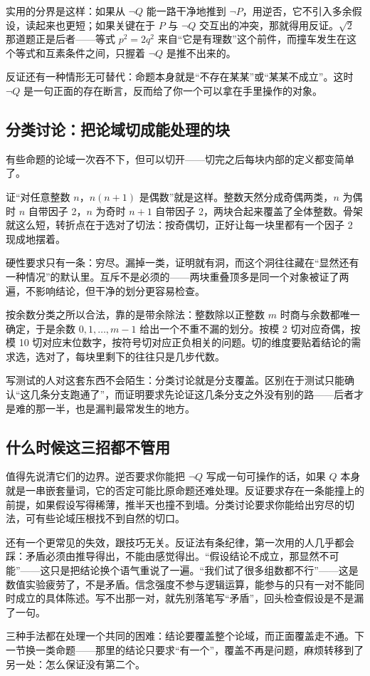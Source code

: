 实用的分界是这样：如果从 \(\neg Q\) 能一路干净地推到 \(\neg P\)，用逆否，它不引入多余假设，读起来也更短；如果关键在于 \(P\) 与 \(\neg Q\) 交互出的冲突，那就得用反证。\(\sqrt2\) 那道题正是后者——等式 \(p^2=2q^2\) 来自``它是有理数''这个前件，而撞车发生在这个等式和互素条件之间，只握着 \(\neg Q\) 是推不出来的。

反证还有一种情形无可替代：命题本身就是``不存在某某''或``某某不成立''。这时 \(\neg Q\) 是一句正面的存在断言，反而给了你一个可以拿在手里操作的对象。

\subsection{分类讨论：把论域切成能处理的块}

有些命题的论域一次吞不下，但可以切开——切完之后每块内部的定义都变简单了。

证``对任意整数 \(n\)，\(n(n+1)\) 是偶数''就是这样。整数天然分成奇偶两类，\(n\) 为偶时 \(n\) 自带因子 2，\(n\) 为奇时 \(n+1\) 自带因子 2，两块合起来覆盖了全体整数。骨架就这么短，转折点在于选对了切法：按奇偶切，正好让每一块里都有一个因子 2 现成地摆着。

硬性要求只有一条：穷尽。漏掉一类，证明就有洞，而这个洞往往藏在``显然还有一种情况''的默认里。互斥不是必须的——两块重叠顶多是同一个对象被证了两遍，不影响结论，但干净的划分更容易检查。

按余数分类之所以合法，靠的是带余除法：整数除以正整数 \(m\) 时商与余数都唯一确定，于是余数 \(0,1,\dots,m-1\) 给出一个不重不漏的划分。按模 2 切对应奇偶，按模 10 切对应末位数字，按符号切对应正负相关的问题。切的维度要贴着结论的需求选，选对了，每块里剩下的往往只是几步代数。

写测试的人对这套东西不会陌生：分类讨论就是分支覆盖。区别在于测试只能确认``这几条分支跑通了''，而证明要求先论证这几条分支之外没有别的路——后者才是难的那一半，也是漏判最常发生的地方。

\subsection{什么时候这三招都不管用}

值得先说清它们的边界。逆否要求你能把 \(\neg Q\) 写成一句可操作的话，如果 \(Q\) 本身就是一串嵌套量词，它的否定可能比原命题还难处理。反证要求存在一条能撞上的前提，如果假设写得稀薄，推半天也撞不到墙。分类讨论要求你能给出穷尽的切法，可有些论域压根找不到自然的切口。

还有一个更常见的失效，跟技巧无关。反证法有条纪律，第一次用的人几乎都会踩：矛盾必须由推导得出，不能由感觉得出。``假设结论不成立，那显然不可能''——这只是把结论换个语气重说了一遍。``我们试了很多组数都不行''——这是数值实验疲劳了，不是矛盾。信念强度不参与逻辑运算，能参与的只有一对不能同时成立的具体陈述。写不出那一对，就先别落笔写``矛盾''，回头检查假设是不是漏了一句。

三种手法都在处理一个共同的困难：结论要覆盖整个论域，而正面覆盖走不通。下一节换一类命题——那里的结论只要求``有一个''，覆盖不再是问题，麻烦转移到了另一处：怎么保证没有第二个。
